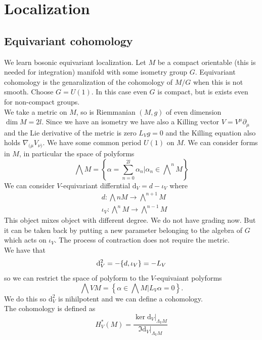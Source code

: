 \documentclass[11pt]{article}
\theoremstyle{definition}
\numberwithin{equation}{section}
\newcommand{\ddv}{\mathrm{d}_V}
\begin{document}
\section{Localization}
\subsection{Equivariant cohomology}
We learn bosonic equivariant localization. Let $M$ be a compact orientable (this is needed for integration) manifold with some isometry group $G$. Equivariant cohomology is the genaralization of the cohomology of $M/G$ when this is not smooth. Choose $G=U(1)$. In this case even $G$ is compact, but is exists even for non-compact groups.\\
We take a metric on $M$, so is Riemmanian $(M,g)$ of even dimension $\dim M = 2l$. Since we have an isometry we have also a Killing vector $V=V^{\mu}\partial_{\mu}$ and the Lie derivative of the metric is zero $L_{V}g=0$ and the Killing equation also holds $\nabla_{(\mu}V_{\nu)}$. We have some common period $U(1)$ on $M$. We can consider forms in $M$, in particular the space of polyforms
\begin{equation}
	\bigwedge M = \left\{\alpha=\sum_{n=0}^{2l}\alpha_{n}|\alpha_{n}\in \bigwedge\nolimits^{n}M\right\}
\end{equation}
We can consider $V$-equivariant differntial $\ddv=d-\iota_{V}$ where
\begin{align}
	&d: \bigwedge\nolimits{n}M \rightarrow \bigwedge\nolimits^{n+1}M\\
	&\iota_{V}: \bigwedge\nolimits^{n} M \rightarrow \bigwedge\nolimits^{n-1} M
\end{align}
This object mixes object with different degree. We do not have grading now. But it can be taken back by putting a new parameter belonging to the algebra of $G$ which acts on $\iota_{V}$. The process of contraction does not require the metric.\\
We have that 
\begin{equation}
	\ddv^{2}= -\acomm{d}{\iota_{V}} = -L_{V}
\end{equation}
so we can restrict the space of polyform to the $V$-equivaiant polyforms
\begin{equation}
	\bigwedge{V}M= \left\{\alpha \in \bigwedge M | L_{V}\alpha=0\right\}.
\end{equation}
We do this so $\ddv^{2}$ is nihilpotent and we can define a cohomology.\\
The cohomology is defined as 
\begin{equation}
	H^{*}_{V}(M) = \frac{\ker \ddv|_{\Lambda_{V}M}}{\Im \ddv|_{\Lambda_{V}M}}
\end{equation}
\end{document}
